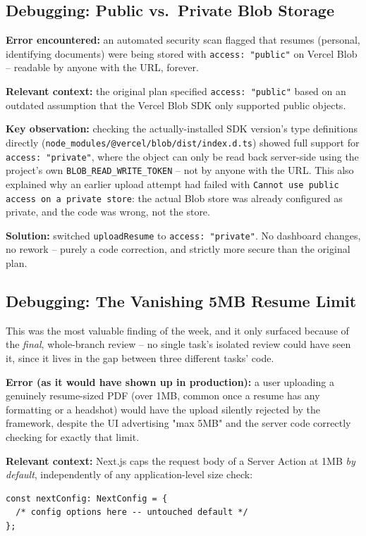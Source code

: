 \documentclass[11pt,a4paper]{article}
\begin{document}
\subsection{Debugging: Public vs.\ Private Blob Storage}
\textbf{Error encountered:} an automated security scan flagged
that resumes (personal, identifying documents) were being stored
with \texttt{access: "public"} on Vercel Blob -- readable by
anyone with the URL, forever.

\textbf{Relevant context:} the original plan specified
\texttt{access: "public"} based on an outdated assumption that
the Vercel Blob SDK only supported public objects.

\textbf{Key observation:} checking the actually-installed SDK
version's type definitions directly
(\texttt{node\_modules/@vercel/blob/dist/index.d.ts}) showed
full support for \texttt{access: "private"}, where the object can
only be read back server-side using the project's own
\texttt{BLOB\_READ\_WRITE\_TOKEN} -- not by anyone with the URL.
This also explained why an earlier upload attempt had failed with
\texttt{Cannot use public access on a private store}: the actual
Blob store was already configured as private, and the code was
wrong, not the store.

\textbf{Solution:} switched \texttt{uploadResume} to
\texttt{access: "private"}. No dashboard changes, no rework --
purely a code correction, and strictly more secure than the
original plan.

\subsection{Debugging: The Vanishing 5MB Resume Limit}
This was the most valuable finding of the week, and it only
surfaced because of the \emph{final}, whole-branch review -- no
single task's isolated review could have seen it, since it lives
in the gap between three different tasks' code.

\textbf{Error (as it would have shown up in production):} a user
uploading a genuinely resume-sized PDF (over 1MB, common once a
resume has any formatting or a headshot) would have the upload
silently rejected by the framework, despite the UI advertising
"max 5MB" and the server code correctly checking for exactly
that limit.

\textbf{Relevant context:} Next.js caps the request body of a
Server Action at 1MB \emph{by default}, independently of any
application-level size check:
\begin{lstlisting}
const nextConfig: NextConfig = {
  /* config options here -- untouched default */
};
\end{lstlisting}
\end{document}
